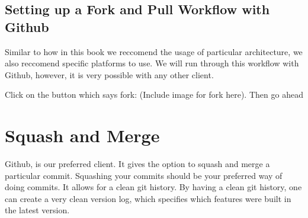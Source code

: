 \subsection { Setting up a Fork and Pull Workflow with Github }
Similar to how in this book we reccomend the usage of particular architecture,
we also reccomend specific platforms to use. We will run through this workflow
with Github, however, it is very possible with any other client.

Click on the button which says fork: (Include image for fork here).
Then go ahead 

\section { Squash and Merge }
Github, is our preferred client. It gives the option to squash and merge a
particular commit. Squashing your commits should be your preferred way of doing
commits. It allows for a clean git history. By having a clean git history, one
can create a very clean version log, which specifies which features were built
in the latest version. 